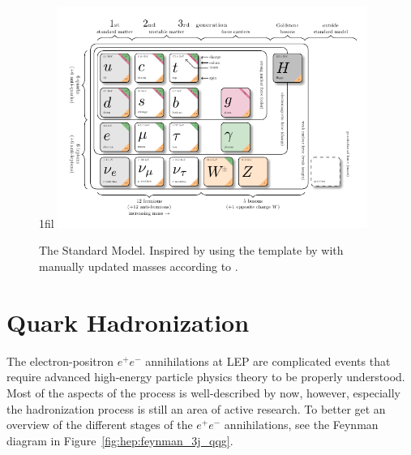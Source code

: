 \documentclass[a4paper, twoside, nobib]{tufte-book}
\makeatletter
\newcommand*{\centerfloat}{%
  \parindent \z@
  \leftskip \z@ \@plus 1fil \@minus \textwidth
  \rightskip\leftskip
  \parfillskip \z@skip}
\makeatother
\begin{document}
\begin{figure}
  \centerfloat
  \includegraphics[width=0.9\textwidth]{figures/standard_model/sm.pdf}
  \caption[The Standard Model]{The Standard Model. Inspired by \citet{purcellGoParticleQuest2012} using the template by \citet{burgardStandardModelPhysics} with manually updated masses according to \citet{particledatagroupReviewParticlePhysics2018}.}
  \label{fig:hep:standard_model}
\end{figure}


\FloatBarrier
\section{Quark Hadronization}
\label{sec:hep:quark_hadronization}

The electron-positron $e^+ e^-$ annihilations at LEP are complicated events that require advanced high-energy particle physics theory to be properly understood. Most of the aspects of the process is well-described by now, however, especially the hadronization process is still an area of active research. To better get an overview of the different stages of the $e^+e^-$ annihilations, see the Feynman diagram in Figure~\ref{fig:hep:feynman_3j_qqg}. 
\end{document}
